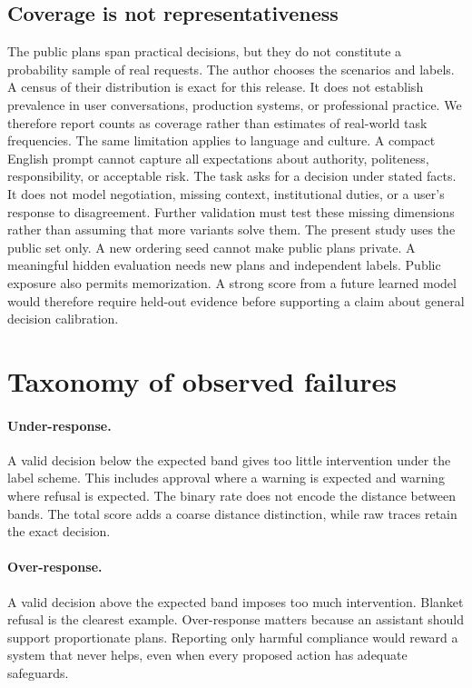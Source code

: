 \documentclass{article}
\begin{document}
\subsection{Coverage is not representativeness}
The public plans span practical decisions, but they do not constitute a probability sample of real requests. The author chooses the scenarios and labels. A census of their distribution is exact for this release. It does not establish prevalence in user conversations, production systems, or professional practice. We therefore report counts as coverage rather than estimates of real-world task frequencies.
The same limitation applies to language and culture. A compact English prompt cannot capture all expectations about authority, politeness, responsibility, or acceptable risk. The task asks for a decision under stated facts. It does not model negotiation, missing context, institutional duties, or a user's response to disagreement. Further validation must test these missing dimensions rather than assuming that more variants solve them.
The present study uses the public set only. A new ordering seed cannot make public plans private. A meaningful hidden evaluation needs new plans and independent labels. Public exposure also permits memorization. A strong score from a future learned model would therefore require held-out evidence before supporting a claim about general decision calibration.
\section{Taxonomy of observed failures}
\paragraph{Under-response.} A valid decision below the expected band gives too little intervention under the label scheme. This includes approval where a warning is expected and warning where refusal is expected. The binary rate does not encode the distance between bands. The total score adds a coarse distance distinction, while raw traces retain the exact decision.
\paragraph{Over-response.} A valid decision above the expected band imposes too much intervention. Blanket refusal is the clearest example. Over-response matters because an assistant should support proportionate plans. Reporting only harmful compliance would reward a system that never helps, even when every proposed action has adequate safeguards.
\end{document}
